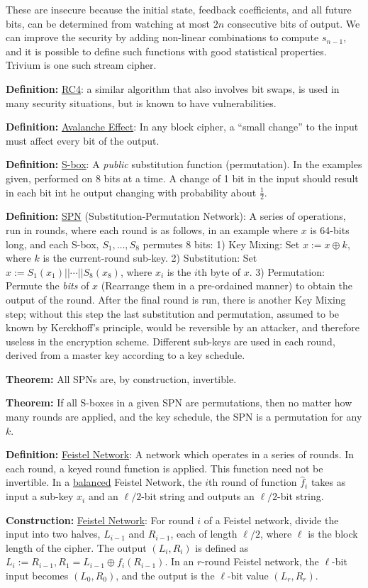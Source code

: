 \documentclass[10pt]{article}
\newcommand{\defn}[1]{{\bf Definition:} \underline{#1}}
\newcommand{\thm}[1]{{\bf Theorem:} \underline{#1}}
\newcommand{\con}[1]{{\bf Construction:} \underline{#1}}
\newcommand{\xor}{\oplus}
\begin{document}
\begin{multicols}{4}
These are insecure because the initial state, feedback coefficients, and all future bits, can be determined from watching at most $2n$ consecutive bits of output. We can improve the security by adding non-linear combinations to compute $s_{n-1}$, and it is possible to define such functions with good statistical properties. Trivium is one such stream cipher.

\defn{RC4}: a similar algorithm that also involves bit swaps, is used in many security situations, but is known to have vulnerabilities.

\defn{Avalanche Effect}: In any block cipher, a ``small change'' to the input must affect every bit of the output.

\defn{S-box}: A {\it public} substitution function (permutation). In the examples given, performed on $8$ bits at a time. A change of 1 bit in the input should result in each bit int he output changing with probability about $\frac{1}{2}$.

\defn{SPN} (Substitution-Permutation Network): A series of operations, run in rounds, where each round is as follows, in an example where $x$ is 64-bits long, and each S-box, $S_1,\dots,S_8$ permutes $8$ bits: 1) Key Mixing: Set $x:=x\xor k$, where $k$ is the current-round sub-key. 2) Substitution: Set $x:=S_1(x_1)||\cdots||S_8(x_8)$, where $x_i$ is the $i$th byte of $x$. 3) Permutation: Permute the {\it bits} of $x$ (Rearrange them in a pre-ordained manner) to obtain the output of the round. After the final round is run, there is another Key Mixing step; without this step the last substitution and permutation, assumed to be known by Kerckhoff's principle, would be reversible by an attacker, and therefore useless in the encryption scheme. Different sub-keys are used in each round, derived from a master key according to a key schedule.

\thm{}All SPNs are, by construction, invertible.

\thm{}If all S-boxes in a given SPN are permutations, then no matter how many rounds are applied, and the key schedule, the SPN is a permutation for any $k$.

\defn{Feistel Network}: A network which operates in a series of rounds. In each round, a keyed round function is applied. This function need not be invertible. In a \underline{balanced} Feistel Network, the $i$th round of function $\hat{f}_i$ takes as input a sub-key $x_i$ and an $\ell/2$-bit string and outputs an $\ell/2$-bit string.

\con{Feistel Network}: For round $i$ of a Feistel network, divide the input into two halves, $L_{i-1}$ and $R_{i-1}$, each of length $\ell/2$, where $\ell$ is the block length of the cipher. The output $(L_i,R_i)$ is defined as $L_i:=R_{i-1}, R_1=L_{i-1}\xor f_i(R_{i-1})$. In an $r$-round Feistel network, the $\ell$-bit input becomes $(L_0,R_0)$, and the output is the $\ell$-bit value $(L_r,R_r)$.


\end{multicols}
\end{document}
